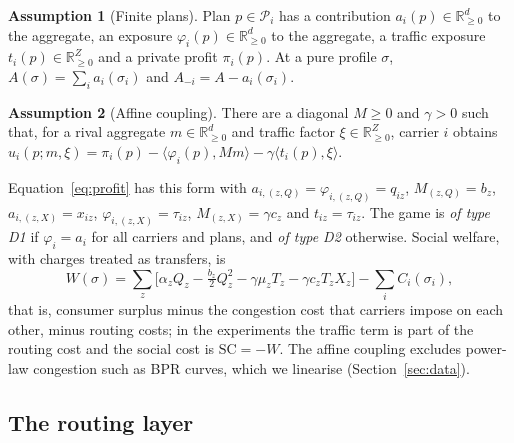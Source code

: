 \documentclass[preprint,12pt]{elsarticle}
\theoremstyle{definition}
\newtheorem{assumption}{Assumption}
\theoremstyle{remark}
\newcommand{\R}{\mathbb{R}}
\newcommand{\cP}{\mathcal{P}}
\newcommand{\ip}[2]{\langle #1,#2\rangle}
\begin{document}
\begin{assumption}[Finite plans]\label{ass:plans}
Plan $p\in\cP_i$ has a contribution $a_i(p)\in\R^d_{\ge0}$ to the aggregate, an exposure $\varphi_i(p)\in\R^d_{\ge0}$ to the aggregate, a traffic exposure $t_i(p)\in\R^Z_{\ge0}$ and a private profit $\pi_i(p)$. At a pure profile $\sigma$, $A(\sigma)=\sum_ia_i(\sigma_i)$ and $A_{-i}=A-a_i(\sigma_i)$.
\end{assumption}

\begin{assumption}[Affine coupling]\label{ass:affine}
There are a diagonal $M\ge0$ and $\gamma>0$ such that, for a rival aggregate $m\in\R^d_{\ge0}$ and traffic factor $\xi\in\R^Z_{\ge0}$, carrier $i$ obtains $u_i(p;m,\xi)=\pi_i(p)-\ip{\varphi_i(p)}{Mm}-\gamma\ip{t_i(p)}{\xi}$.
\end{assumption}

Equation~\eqref{eq:profit} has this form with $a_{i,(z,Q)}=\varphi_{i,(z,Q)}=q_{iz}$, $M_{(z,Q)}=b_z$, $a_{i,(z,X)}=x_{iz}$, $\varphi_{i,(z,X)}=\tau_{iz}$, $M_{(z,X)}=\gamma c_z$ and $t_{iz}=\tau_{iz}$. The game is \emph{of type D1} if $\varphi_i=a_i$ for all carriers and plans, and \emph{of type D2} otherwise. Social welfare, with charges treated as transfers, is
\begin{equation}\label{eq:welfare}
W(\sigma)=\sum_z\big[\alpha_zQ_z-\tfrac{b_z}{2}Q_z^2-\gamma\mu_zT_z-\gamma c_zT_zX_z\big]-\sum_iC_i(\sigma_i),
\end{equation}
that is, consumer surplus minus the congestion cost that carriers impose on each other, minus routing costs; in the experiments the traffic term is part of the routing cost and the social cost is $\mathrm{SC}=-W$. The affine coupling excludes power-law congestion such as BPR curves, which we linearise (Section~\ref{sec:data}).

\subsection{The routing layer}\label{sec:routing}
\end{document}
